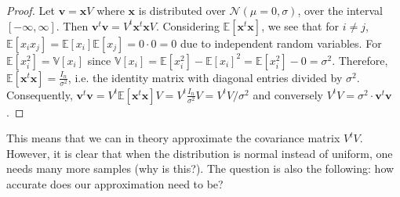 \begin{proof}
Let $\mathbf{v} = \mathbf{x}\mathit{V}$ where $\mathbf{x}$ is distributed over $\mathcal{N}(\mu = 0,\sigma)$, over the interval $[-\infty, \infty]$.
Then $\mathbf{v}^t\mathbf{v} = \mathit{V}^t \mathbf{x}^t \mathbf{x} \mathit{V}$. Considering $\mathbb{E}[\mathbf{x}^t \mathbf{x}]$, we see that for $i \neq j$, 
$\mathbb{E}[x_i x_j] = \mathbb{E}[x_i] \mathbb{E}[x_j] = 0 \cdot 0 = 0$ due to independent random variables.
For $\mathbb{E}[x_i^2] = \mathbb{V}[x_i]$ since $\mathbb{V}[x_i] = \mathbb{E}[x_i^2] - \mathbb{E}[x_i]^2 = \mathbb{E}[x_i^2] - 0 = \sigma ^2$.
Therefore, $\mathbb{E}[\mathbf{x}^t \mathbf{x}] = \frac{\mathit{I}_n}{\sigma^2}$, i.e. the identity matrix with diagonal entries divided by $\sigma ^2$.
Consequently, $\mathbf{v}^t \mathbf{v} = \mathit{V}^t \mathbb{E}[\mathbf{x}^t\mathbf{x}] \mathit{V} = \mathit{V}^t \frac{\mathit{I}_n}{\sigma^2} \mathit{V} = \mathit{V}^t \mathit{V} / \sigma ^2$ 
and conversely $\mathit{V}^t \mathit{V} = \sigma^2 \cdot \mathbf{v}^t \mathbf{v}$.
\end{proof}

This means that we can in theory approximate the covariance matrix $\mathit{V}^t \mathit{V}$. However, it is clear that when the distribution is normal instead of uniform, one needs many more samples (why is this?).
The question is also the following: how accurate does our approximation need to be?

